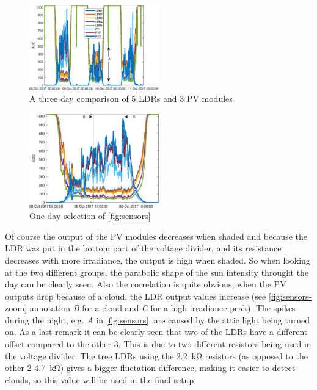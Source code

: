 \documentclass[a4paper,journal]{DDREAM}
\begin{document}
\begin{figure}[H]
\centering
    \includegraphics[width=0.5\textwidth]{./resources/sensors.eps}
    \caption{A three day comparison of 5 LDRs and 3 PV modules}\label{fig:sensors}
\end{figure}

\begin{figure}[H]
\centering
    \includegraphics[width=0.5\textwidth]{./resources/sensors-zoom.eps}
    \caption{One day selection of \autoref{fig:sensors}}\label{fig:sensors-zoom}
\end{figure}

Of course the output of the PV modules decreases when shaded and because the LDR was put in the bottom part of the voltage divider, and its resistance decreases with more irradiance, the output is high when shaded.
So when looking at the two different groups, the parabolic shape of the sun intensity throught the day can be clearly seen.
Also the correlation is quite obvious, when the PV outputs drop because of a cloud, the LDR output values increase (see \autoref{fig:sensors-zoom} annotation \emph{B} for a cloud and \emph{C} for a high irradiance peak).
The spikes during the night, e.g. \emph{A} in \autoref{fig:sensors}, are caused by the attic light being turned on.
As a last remark it can be clearly seen that two of the LDRs have a different offset compared to the other 3.
This is due to two different resistors being used in the voltage divider.
The tree LDRs using the \SI{2.2}{\kilo\ohm} resistors (as opposed to the other 2 \SI{4.7}{\kilo\ohm}) gives a bigger fluctation difference, making it easier to detect clouds, so this value will be used in the final setup
\end{document}
